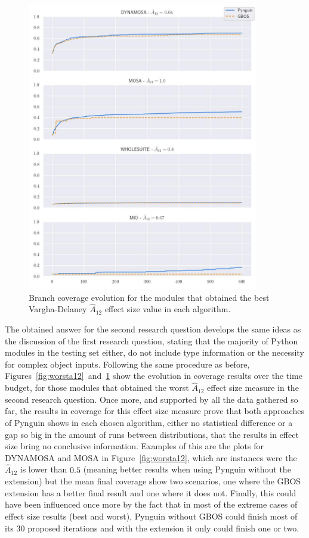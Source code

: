 \documentclass[%
  chapterprefix=false,%
  open=right,%
  twoside=true,%
  paper=a4,%
  logofile={Figures/logo.png},%
  thesistype=master,%
  UKenglish,%
]{se2thesis}
\begin{document}
\begin{figure}[ptbh]
  \centering
  \includegraphics[width=0.9\textwidth]{Figures/Results/bestA12.jpg}
  \caption{Branch coverage evolution for the modules that obtained the best Vargha-Delaney \(\hat{A}_{12}\) effect size value in each algorithm.}\label{fig:besta12}
\end{figure}

The obtained answer for the second research question develops the same ideas as the discussion of the first research question, stating that the majority of Python modules in the testing set either, do not include type information or the necessity for complex object inputs.
Following the same procedure as before, Figures~\ref{fig:worsta12}~and~\ref{fig:besta12} show the evolution in coverage results over the time budget, for those modules that obtained the worst \(\hat{A}_{12}\) effect size measure in the second research question.
Once more, and supported by all the data gathered so far, the results in coverage for this effect size measure prove that both approaches of Pynguin shows in each chosen algorithm, either no statistical difference or a gap so big in the amount of runs between distributions, that the results in effect size bring no conclusive information.
Examples of this are the plots for DYNAMOSA and MOSA in Figure~\ref{fig:worsta12}, which are instances were the \(\hat{A}_{12}\) is lower than \(0.5\) (meaning better results when using Pynguin without the extension) but the mean final coverage show two scenarios, one where the GBOS extension has a better final result and one where it does not.
Finally, this could have been influenced once more by the fact that in most of the extreme cases of effect size results (best and worst), Pynguin without GBOS could finish most of its 30 proposed iterations and with the extension it only could finish one or two. 
\end{document}
